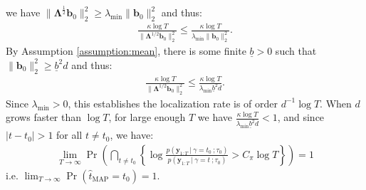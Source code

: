 we have $\lVert\boldsymbol{\Lambda}^{\frac{1}{2}} \mathbf{b}_0\rVert^2_2 \geq \lambda_{\min} \lVert \mathbf{b}_0\rVert^2_2$ and thus:
\begin{align*}
    \frac{\kappa \log T}{\lVert \boldsymbol{\Lambda}^{1/2}\mathbf{b}_0\rVert_2^2} \leq 
    \frac{\kappa \log T}{\lambda_{\min}\lVert\mathbf{b}_0\rVert_2^2}. 
\end{align*}
By Assumption \ref{assumption:mean}, there is some finite $\underline{b} > 0$ such that $\lVert\mathbf{b}_0\rVert_2^2 \geq \underline{b}^2 d$ and thus:
\begin{align*}
    \frac{\kappa \log T}{\lVert \boldsymbol{\Lambda}^{1/2}\mathbf{b}_0\rVert_2^2} \leq 
    \frac{\kappa \log T}{\lambda_{\min}\underline{b}^2 d}. 
\end{align*}
Since $\lambda_{\min} > 0$, this establishes the localization rate is of order $d^{-1} \log T$. When $d$ grows faster than $\log T$, for large enough $T$ we have $\frac{\kappa \log T}{\lambda_{\min}\underline{b}^2 d} < 1$, and since $|t - t_0| > 1$ for all $t\neq t_0$, we have:
\begin{align*}
    \lim_{T\to\infty}\Pr\left(\bigcap_{t \neq t_0}\left\{ \log \frac{p(\mathbf{y}_{1:T} \:|\:\gamma = t_0 \:; \tau_0)}{p(\mathbf{y}_{1:T} \:|\:\gamma = t \:; \tau_0)} > C_\pi \log T\right\}\right) = 1
\end{align*}
i.e. $\lim_{T\to\infty}\Pr(\hat{t}_{\text{MAP}} = t_0) = 1$. 

